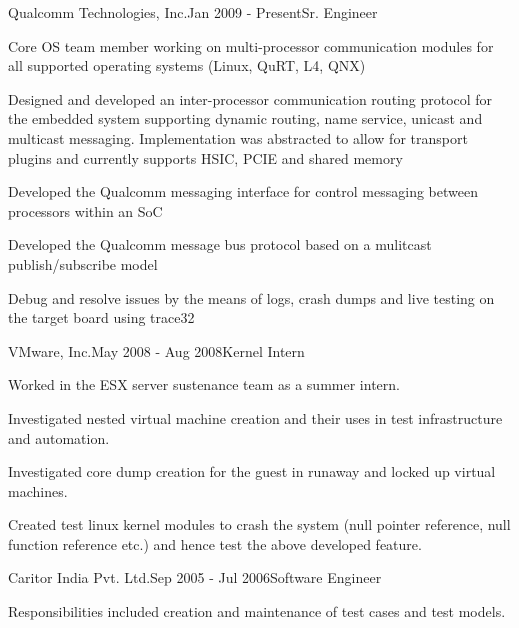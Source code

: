 \begin{rSubsection}{Qualcomm Technologies, Inc.}{Jan 2009 - Present}{Sr. Engineer}{}
  \item Core OS team member working on multi-processor communication modules for all supported operating systems (Linux, QuRT, L4, QNX)
  \item Designed and developed an inter-processor communication routing protocol for the embedded system supporting dynamic routing, name service, unicast and multicast messaging. Implementation was abstracted to allow for transport plugins and currently supports HSIC, PCIE and shared memory
  \item Developed the Qualcomm messaging interface for control messaging between processors within an SoC
  \item Developed the Qualcomm message bus protocol based on a mulitcast publish/subscribe model
  \item Debug and resolve issues by the means of logs, crash dumps and live testing on the target board using trace32
\end{rSubsection}


\begin{rSubsection}{VMware, Inc.}{May 2008 - Aug 2008}{Kernel Intern}{}
  \item Worked in the ESX server sustenance team as a summer intern.
  \item Investigated nested virtual machine creation and their uses in test infrastructure and automation.
  \item Investigated core dump creation for the guest in runaway and locked up virtual machines.
  \item Created test linux kernel modules to crash the system (null pointer reference, null function reference etc.) and hence test the above developed feature.
\end{rSubsection}


\begin{rSubsection}{Caritor India Pvt. Ltd.}{Sep 2005 - Jul 2006}{Software Engineer}{}
  \item Responsibilities included creation and maintenance of test cases and test models.
\end{rSubsection}
